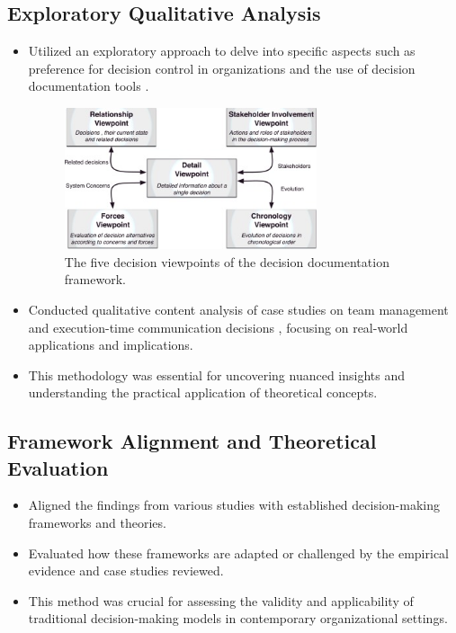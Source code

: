 \documentclass[12pt]{article}
\begin{document}
\subsection{Exploratory Qualitative Analysis}
\begin{itemize}
  \item Utilized an exploratory approach to delve into specific aspects such as preference for decision control in organizations \cite{reference6} and the use of decision documentation tools \cite{reference7}.\\
 \begin{figure}[h]
    \centering
     \includegraphics[width=0.7\textwidth]{viewpoints.jpg}
    \caption{The five decision viewpoints of the decision documentation framework.}
    \label{fig:figure1}
\end{figure}

  \item Conducted qualitative content analysis of case studies on team management \cite{reference8} and execution-time communication decisions \cite{reference9}, focusing on real-world applications and implications.
  \item This methodology was essential for uncovering nuanced insights and understanding the practical application of theoretical concepts.
\end{itemize}

\subsection{Framework Alignment and Theoretical Evaluation}
\begin{itemize}
  \item Aligned the findings from various studies with established decision-making frameworks and theories.
  \item Evaluated how these frameworks are adapted or challenged by the empirical evidence and case studies reviewed.
  \item This method was crucial for assessing the validity and applicability of traditional decision-making models in contemporary organizational settings.
\end{itemize}
\end{document}
